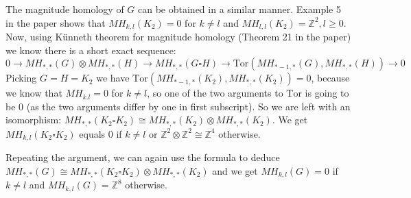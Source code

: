 \documentclass{article}
\begin{document}
The magnitude homology of $G$ can be obtained in a similar manner.
Example 5 in the paper shows that $MH_{k,l}(K_2) = 0$ for $k \neq l$ and 
$MH_{l,l}(K_2)= \mathbb{Z}^2, l \geq 0$.
Now, using Künneth theorem for magnitude homology (Theorem 21 in the paper) we know there is a short exact sequence:
\begin{equation*}
0 \to MH_{*,*}(G) \otimes MH_{*,*}(H) \to MH_{*,*}(G \square H) \to \mathrm{Tor}(MH_{*-1,*}(G),MH_{*,*}(H)) \to 0
\end{equation*}
Picking $G=H = K_2$ we have $\mathrm{Tor}(MH_{*-1,*}(K_2),MH_{*,*}(K_2)) = 0$, because we know that $MH_{k.l} = 0$ for $k \neq l$, so one of the two arguments to $\mathrm{Tor}$ is going to be $0$ (as the two arguments differ by one in first subscript). 
So we are left with an isomorphism:
$MH_{*,*}(K_2 \square K_2) \cong MH_{*,*}(K_2) \otimes MH_{*,*}(K_2)$.
We get $MH_{k,l}(K_2 \square K_2)$ equals $0$ if $k \neq l$ or $\mathbb{Z}^2 \otimes \mathbb{Z}^2 \cong \mathbb{Z}^4$ otherwise.

Repeating the argument, we can again use the formula to deduce $MH_{*,*} (G) \cong MH_{*,*} (K_2 \square K_2) \otimes MH_{*,*} (K_2)$ and we get
$MH_{k,l}(G) = 0$ if $k \neq l$ and $MH_{k,l}(G) = \mathbb{Z}^8$ otherwise.
\end{document}
